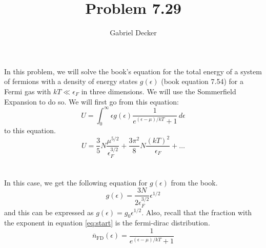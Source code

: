 \documentclass[12pt]{article}
\title{Problem 7.29}
\author{Gabriel Decker}
\begin{document}
\maketitle
\begin{flushleft}



In this problem, we will solve the book's equation for the total energy of a system of fermions with a density of energy states $g(\epsilon)$ (book equation 7.54) for a Fermi gas with $kT\ll\epsilon_F$ in three dimensions.
We will use the Sommerfield Expansion to do so.
We will first go from this equation:
\begin{equation}
    \label{eq:start}
    U=\int_0^\infty\epsilon g(\epsilon)\frac{1}{e^{(\epsilon-\mu)/kT}+1}\,d\epsilon
\end{equation}
to this equation.
\begin{equation}
    U=\frac{3}{5}N\frac{\mu^{5/2}}{\epsilon_F^{3/2}}+\frac{3\pi^2}{8}N\frac{(kT)^2}{\epsilon_F}+\dots
\end{equation}\\~\\

In this case, we get the following equation for $g(\epsilon)$ from the book.
\begin{equation}
    g(\epsilon)=\frac{3N}{2\epsilon_F^{3/2}}\epsilon^{1/2}
\end{equation}
and this can be expressed as $g(\epsilon)=g_0\epsilon^{1/2}$.
Also, recall that the fraction with the exponent in equation \ref{eq:start} is the fermi-dirac distribution.
\begin{equation}
    \overline{n}_\text{FD}(\epsilon)=\frac{1}{e^{(\epsilon-\mu)/kT}+1}
\end{equation}\\~\\


\end{flushleft}
\end{document}
